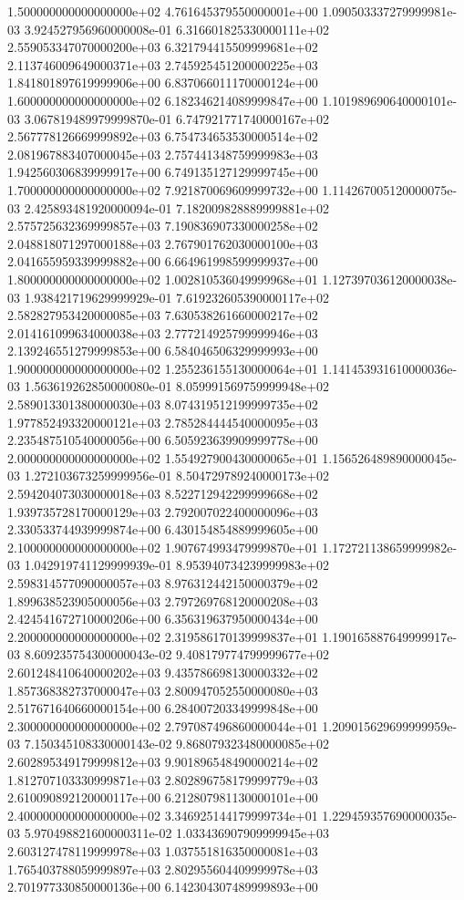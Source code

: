 \documentclass{article}
\begin{document}
\begin{center}
{1.500000000000000000e+02 4.761645379550000001e+00 1.090503337279999981e-03 3.924527956960000008e-01 6.316601825330000111e+02 2.559053347070000200e+03 6.321794415509999681e+02 2.113746009649000371e+03 2.745925451200000225e+03 1.841801897619999906e+00 6.837066011170000124e+00
1.600000000000000000e+02 6.182346214089999847e+00 1.101989690640000101e-03 3.067819489979999870e-01 6.747921771740000167e+02 2.567778126669999892e+03 6.754734653530000514e+02 2.081967883407000045e+03 2.757441348759999983e+03 1.942560306839999917e+00 6.749135127129999745e+00
1.700000000000000000e+02 7.921870069609999732e+00 1.114267005120000075e-03 2.425893481920000094e-01 7.182009828889999881e+02 2.575725632369999857e+03 7.190836907330000258e+02 2.048818071297000188e+03 2.767901762030000100e+03 2.041655959339999882e+00 6.664961998599999937e+00
1.800000000000000000e+02 1.002810536049999968e+01 1.127397036120000038e-03 1.938421719629999929e-01 7.619232605390000117e+02 2.582827953420000085e+03 7.630538261660000217e+02 2.014161099634000038e+03 2.777214925799999946e+03 2.139246551279999853e+00 6.584046506329999993e+00
1.900000000000000000e+02 1.255236155130000064e+01 1.141453931610000036e-03 1.563619262850000080e-01 8.059991569759999948e+02 2.589013301380000030e+03 8.074319512199999735e+02 1.977852493320000121e+03 2.785284444540000095e+03 2.235487510540000056e+00 6.505923639909999778e+00
2.000000000000000000e+02 1.554927900430000065e+01 1.156526489890000045e-03 1.272103673259999956e-01 8.504729789240000173e+02 2.594204073030000018e+03 8.522712942299999668e+02 1.939735728170000129e+03 2.792007022400000096e+03 2.330533744939999874e+00 6.430154854889999605e+00
2.100000000000000000e+02 1.907674993479999870e+01 1.172721138659999982e-03 1.042919741129999939e-01 8.953940734239999983e+02 2.598314577090000057e+03 8.976312442150000379e+02 1.899638523905000056e+03 2.797269768120000208e+03 2.424541672710000206e+00 6.356319637950000434e+00
2.200000000000000000e+02 2.319586170139999837e+01 1.190165887649999917e-03 8.609235754300000043e-02 9.408179774799999677e+02 2.601248410640000202e+03 9.435786698130000332e+02 1.857368382737000047e+03 2.800947052550000080e+03 2.517671640660000154e+00 6.284007203349999848e+00
2.300000000000000000e+02 2.797087496860000044e+01 1.209015629699999959e-03 7.150345108330000143e-02 9.868079323480000085e+02 2.602895349179999812e+03 9.901896548490000214e+02 1.812707103330999871e+03 2.802896758179999779e+03 2.610090892120000117e+00 6.212807981130000101e+00
2.400000000000000000e+02 3.346925144179999734e+01 1.229459357690000035e-03 5.970498821600000311e-02 1.033436907909999945e+03 2.603127478119999978e+03 1.037551816350000081e+03 1.765403788059999897e+03 2.802955604409999978e+03 2.701977330850000136e+00 6.142304307489999893e+00
}
\end{center}
\end{document}
